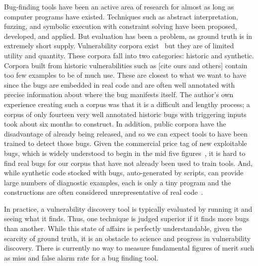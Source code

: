 \label{sec:motivation}

Bug-finding tools have been an active area of research for almost as long as computer programs have existed. 
Techniques such as abstract interpretation, fuzzing, and symbolic execution with constraint solving have been proposed, developed, and applied.
But evaluation has been a problem, as  ground truth is in extremely short supply.
Vulnerability corpora exist~\cite{Kass:2005} but they are of limited utility and quantity.
These corpora fall into two categories: historic and synthetic.
Corpora built from historic vulnerabilities such as [cite ours and others] contain too few examples to be of much use.
These are closest to what we want to have since the bugs are embedded in real code and are often well annotated with precise information about where the bug manifests itself.
The author's own experience creating such a corpus was that it is a difficult and lengthy process; a corpus of only fourteen very well annotated historic bugs with triggering inputs took about six months to construct. 
In addition, public corpora have the disadvantage of already being released, and so we can expect tools to have been trained to detect those bugs.
Given the commercial price tag of new exploitable bugs, which is widely understood to begin in the mid five figures~\cite{Tsyrklevich:2015}, it is hard to find real bugs for our corpus that have not already been used to train tools.
And, while synthetic code stocked with bugs, auto-generated by scripts, can provide large numbers of diagnostic examples, each is only a tiny program and the constructions are often considered unrepresentative of real code~\cite{Kratkiewicz:2005,Juliet:2012}.

In practice, a vulnerability discovery tool is typically evaluated by running it and seeing what it finds. 
Thus, one technique is judged superior if it finds more bugs than another.
While this state of affairs is perfectly understandable, given the scarcity of ground truth, it is an obstacle to science and progress in vulnerability discovery.
There is currently no way to measure fundamental figures of merit such as miss and false alarm rate for a bug finding tool.

